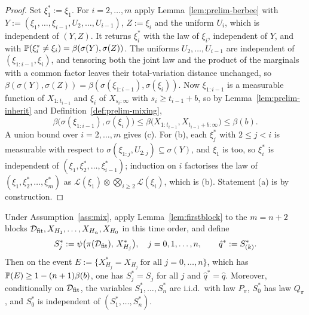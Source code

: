 \documentclass[../../../main.tex]{subfiles}
\begin{document}
\begin{proof}
Set $\xi^*_1:=\xi_1$. For $i=2,\dots,m$ apply Lemma~\ref{lem:prelim-berbee} with $Y:=(\xi_1,\dots,\xi_{i-1},U_2,\dots,U_{i-1})$, $Z:=\xi_i$ and the uniform $U_i$, which is independent of $(Y,Z)$. It returns $\xi^*_i$ with the law of $\xi_i$, independent of $Y$, and with $\mathbb{P}(\xi^*_i\ne\xi_i)=\beta(\sigma(Y),\sigma(Z))$. The uniforms $U_2,\dots,U_{i-1}$ are independent of $(\xi_{1:i-1},\xi_i)$, and tensoring both the joint law and the product of the marginals with a common factor leaves their total-variation distance unchanged, so $\beta(\sigma(Y),\sigma(Z))=\beta(\sigma(\xi_{1:i-1}),\sigma(\xi_i))$. Now $\xi_{1:i-1}$ is a measurable function of $X_{1:t_{i-1}}$ and $\xi_i$ of $X_{s_i:\infty}$ with $s_i\ge t_{i-1}+b$, so by Lemma~\ref{lem:prelim-inherit} and Definition~\ref{def:prelim-mixing},
\[
\beta\big(\sigma(\xi_{1:i-1}),\sigma(\xi_i)\big)\le\beta\big(X_{1:t_{i-1}},X_{t_{i-1}+b:\infty}\big)\le\beta(b).
\]
A union bound over $i=2,\dots,m$ gives (c). For (b), each $\xi^*_j$ with $2\le j<i$ is measurable with respect to $\sigma(\xi_{1:j},U_{2:j})\subseteq\sigma(Y)$, and $\xi_1$ is too, so $\xi^*_i$ is independent of $(\xi_1,\xi^*_2,\dots,\xi^*_{i-1})$; induction on $i$ factorises the law of $(\xi_1,\xi^*_2,\dots,\xi^*_m)$ as $\mathcal L(\xi_1)\otimes\bigotimes_{i\ge2}\mathcal L(\xi_i)$, which is (b). Statement (a) is by construction.
\end{proof}

\begin{corollary}\label{cor:coupled}
Under Assumption~\ref{ass:mix}, apply Lemma~\ref{lem:firstblock} to the $m=n+2$ blocks $\mathcal D_{\mathrm{fit}},X_{H_1},\dots,X_{H_n},X_{H_0}$ in this time order, and define
\[
S^*_j:=\psi\big(\pi(\mathcal D_{\mathrm{fit}}),\,X^*_{H_j}\big),\quad j=0,1,\dots,n,\qquad \hat q^*:=S^*_{(k)} .
\]
Then on the event $E:=\{X^*_{H_j}=X_{H_j}\ \text{for all } j=0,\dots,n\}$, which has $\mathbb{P}(E)\ge1-(n+1)\beta(b)$, one has $S^*_j=S_j$ for all $j$ and $\hat q^*=\hat q$. Moreover, conditionally on $\mathcal D_{\mathrm{fit}}$, the variables $S^*_1,\dots,S^*_n$ are i.i.d.\ with law $P_\pi$, $S^*_0$ has law $Q_\pi$, and $S^*_0$ is independent of $(S^*_1,\dots,S^*_n)$.
\end{corollary}
\end{document}
